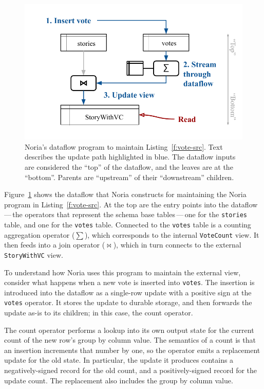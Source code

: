 \begin{figure}[t]
  \centering
  \includegraphics{diagrams/Example Execution.pdf}
  \caption{Noria's dataflow program to maintain Listing~\ref{f:vote-src}. Text
  describes the update path highlighted in blue. The dataflow inputs are
  considered the ``top'' of the dataflow, and the leaves are at the ``bottom''.
  Parents are ``upstream'' of their ``downstream'' children.}
  \label{f:example-exec}
\end{figure}

Figure~\ref{f:example-exec} shows the dataflow that Noria constructs for
maintaining the Noria program in Listing~\ref{f:vote-src}. At the top are the
entry points into the dataflow\,---\,the operators that represent the schema
base tables\,---\,one for the \texttt{stories} table, and one for the
\texttt{votes} table. Connected to the \texttt{votes} table is a counting
aggregation operator ($\sum$), which corresponds to the internal
\texttt{VoteCount} view. It then feeds into a join operator ($\bowtie$), which
in turn connects to the external \texttt{StoryWithVC} view.

To understand how Noria uses this program to maintain the external view,
consider what happens when a new vote is inserted into \texttt{votes}. The
insertion is introduced into the dataflow as a single-row update with a positive
sign at the \texttt{votes} operator. It stores the update to durable storage,
and then forwards the update as-is to its children; in this case, the count
operator.

The count operator performs a lookup into its own output state for the current
count of the new row's group by column value. The semantics of a count is that
an insertion increments that number by one, so the operator emits a replacement
update for the old state. In particular, the update it produces contains a
negatively-signed record for the old count, and a positively-signed record for
the update count. The replacement also includes the group by column value.


